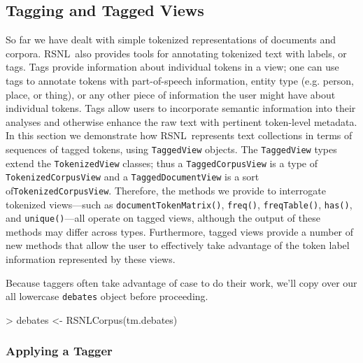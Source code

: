 \documentclass[11pt]{article}
\def\RSNL{{\normalfont\fontseries{b}\selectfont RSNL}}
\let\code=\texttt
\let\rclass=\texttt
\begin{document}
\subsection{Tagging and Tagged Views}

So far we have dealt with simple tokenized representations of
documents and corpora.  \RSNL\ also provides tools for annotating
tokenized text with labels, or tags.  Tags provide information about
individual tokens in a view; one can use tags to annotate tokens with
part-of-speech information, entity type (e.g. person, place, or
thing), or any other piece of information the user might have about
individual tokens.  Tags allow users to incorporate semantic
information into their analyses and otherwise enhance the raw text
with pertinent token-level metadata.  In this section we demonstrate
how \RSNL\ represents text collections in terms of sequences of tagged
tokens, using \rclass{TaggedView} objects.  The \rclass{TaggedView}
types extend the \rclass{TokenizedView} classes; thus a
\rclass{TaggedCorpusView} is a type of \rclass{TokenizedCorpusView}
and a \rclass{TaggedDocumentView} is a sort
of\rclass{TokenizedCorpusView}.  Therefore, the methods we provide to
interrogate tokenized views---such as \code{documentTokenMatrix()},
\code{freq()}, \code{freqTable()}, \code{has()}, and
\code{unique()}---all operate on tagged views, although the output of
these methods may differ across types.  Furthermore, tagged views
provide a number of new methods that allow the user to effectively
take advantage of the token label information represented by these
views.

Because taggers often take advantage of case to do their work, we'll
copy over our all lowercase \code{debates} object before proceeding.
\begin{Schunk}
\begin{Sinput}
> debates <- RSNLCorpus(tm.debates)
\end{Sinput}
\end{Schunk}

\subsubsection{Applying a Tagger}
\end{document}
